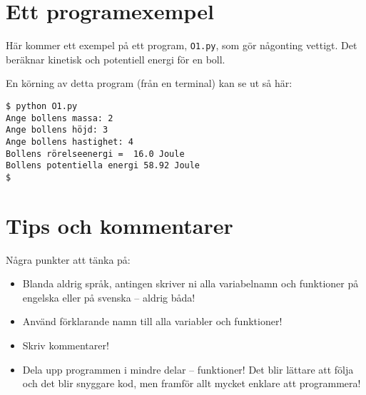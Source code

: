 \section{Ett programexempel}

Här kommer ett exempel på ett program, \verb'O1.py', som gör någonting vettigt.
Det beräknar kinetisk och potentiell energi för en boll.



En körning av detta program (från en terminal) kan se ut så här:
\begin{lstlisting}[style=text]
$ python O1.py
Ange bollens massa: 2
Ange bollens höjd: 3
Ange bollens hastighet: 4
Bollens rörelseenergi =  16.0 Joule
Bollens potentiella energi 58.92 Joule
$

\end{lstlisting}



\section{Tips och kommentarer}

Några punkter att tänka på:
\begin{itemize}
	\item Blanda aldrig språk, antingen skriver ni alla variabelnamn och
	funktioner på engelska eller på svenska -- aldrig båda!
	\item Använd förklarande namn till alla variabler och funktioner!
	\item Skriv kommentarer!
	\item Dela upp programmen i mindre delar -- funktioner! Det blir
	lättare att följa och det blir snyggare kod, men framför allt mycket
	enklare att programmera!
\end{itemize}

